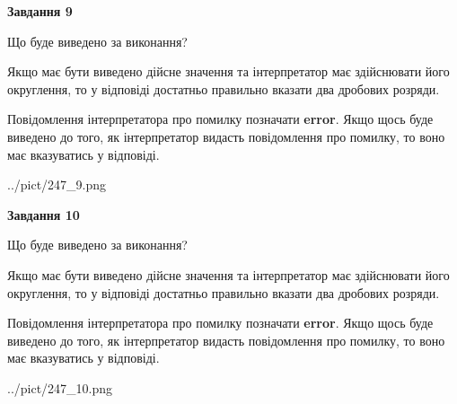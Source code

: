 \documentclass[12pt, ukrainian]{article}
\begin{document}
{\begin {Large}
{\begin {center}\textbf{Завдання 9}\end {center}}\par
Що буде виведено за виконання? \par

Якщо має бути виведено дійсне значення та інтерпретатор має здійснювати його округлення, 
то у відповіді достатньо правильно вказати два дробових розряди.

Повідомлення інтерпретатора про помилку позначати \textbf{error}.
Якщо щось буде виведено до того, як інтерпретатор видасть повідомлення про помилку, 
то воно має вказуватись у відповіді. \par

\begin{center}
	{../pict/247_9.png}
\end{center}
\newpage

{\begin {center}\textbf{Завдання 10}\end {center}}\par
Що буде виведено за виконання? \par

Якщо має бути виведено дійсне значення та інтерпретатор має здійснювати його округлення, 
то у відповіді достатньо правильно вказати два дробових розряди.

Повідомлення інтерпретатора про помилку позначати \textbf{error}.
Якщо щось буде виведено до того, як інтерпретатор видасть повідомлення про помилку, 
то воно має вказуватись у відповіді. \par

\begin{center}
	{../pict/247_10.png}
\end{center}
\newpage

\end {Large}}
\end{document}
